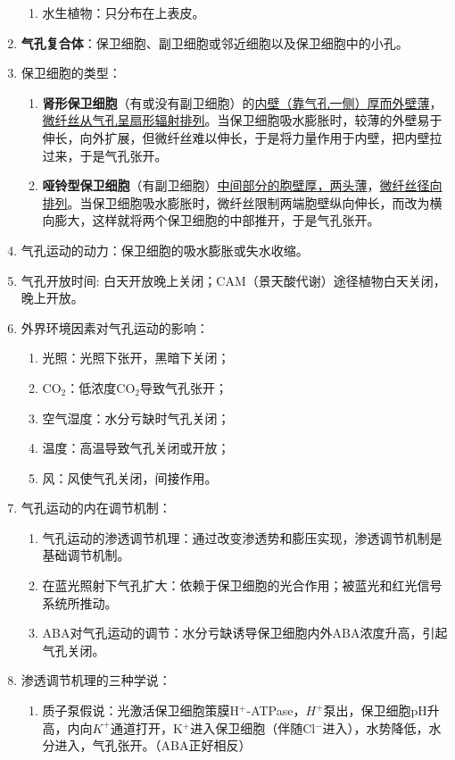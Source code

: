 \begin{enumerate}
\begin{enumerate}
        \item 水生植物：只分布在上表皮。
    \end{enumerate}
    \item \textbf{气孔复合体}：保卫细胞、副卫细胞或邻近细胞以及保卫细胞中的小孔。
    \item 保卫细胞的类型：
    \begin{enumerate}
        \item \textbf{肾形保卫细胞}（有或没有副卫细胞）的\uline{内壁（靠气孔一侧）厚而外壁薄}，\uline{微纤丝从气孔呈扇形辐射排列}。当保卫细胞吸水膨胀时，较薄的外壁易于伸长，向外扩展，但微纤丝难以伸长，于是将力量作用于内壁，把内壁拉过来，于是气孔张开。
        \item \textbf{哑铃型保卫细胞}（有副卫细胞）\uline{中间部分的胞壁厚，两头薄}，\uline{微纤丝径向排列}。当保卫细胞吸水膨胀时，微纤丝限制两端胞壁纵向伸长，而改为横向膨大，这样就将两个保卫细胞的中部推开，于是气孔张开。
    \end{enumerate}
    \item 气孔运动的动力：保卫细胞的吸水膨胀或失水收缩。
    \item 气孔开放时间: 白天开放晚上关闭；CAM（景天酸代谢）途径植物白天关闭，晚上开放。
    \item 外界环境因素对气孔运动的影响：
    \begin{enumerate}
        \item 光照：光照下张开，黑暗下关闭；
        \item CO$_2$：低浓度CO$_2$导致气孔张开；
        \item 空气湿度：水分亏缺时气孔关闭；
        \item 温度：高温导致气孔关闭或开放；
        \item 风：风使气孔关闭，间接作用。
    \end{enumerate}
    \item 气孔运动的内在调节机制：
    \begin{enumerate}
        \item 气孔运动的渗透调节机理：通过改变渗透势和膨压实现，渗透调节机制是基础调节机制。
        \item 在蓝光照射下气孔扩大：依赖于保卫细胞的光合作用；被蓝光和红光信号系统所推动。  
        \item ABA对气孔运动的调节：水分亏缺诱导保卫细胞内外ABA浓度升高，引起气孔关闭。
    \end{enumerate}
    \item 渗透调节机理的三种学说：
    \begin{enumerate}
        \item 质子泵假说：光激活保卫细胞策膜H$^+$-ATPase，$H^+$泵出，保卫细胞pH升高，内向$K^+$通道打开，K$^+$进入保卫细胞（伴随Cl$^-$进入），水势降低，水分进入，气孔张开。（ABA正好相反）

\end{enumerate}
\end{enumerate}

